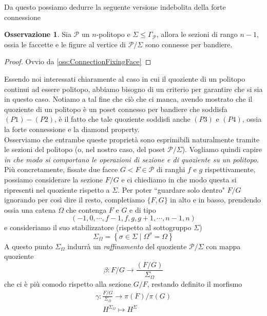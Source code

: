 \documentclass[a4paper,12pt]{report}
\newcommand{\p}{\mathcal{P}}
\theoremstyle{plain}
\theoremstyle{definition}
\newtheorem{oss}[teo]{Osservazione}
\begin{document}
Da questo possiamo dedurre la seguente versione indebolita della forte connessione
\begin{oss}
Sia $\p$ un $n$-politopo e $\Sigma\leq\Gamma_\p$, allora le sezioni di rango $n-1$, ossia le faccette e le figure al vertice di $\p/\Sigma$ sono
connesse per bandiere.
\end{oss}
\begin{proof}
Ovvio da \ref{oss:ConnectionFixingFace}
\end{proof}
Essendo noi interessati chiaramente al caso in cui il quoziente di un politopo continui ad essere politopo, abbiamo bisogno di un criterio per
garantire che si sia in questo caso. Notiamo a tal fine che ci\`o che ci manca, avendo mostrato che il quoziente di un politopo \`e un poset
connesso per bandiere che soddisfa $(P1)-(P2)$, \`e il fatto che tale quoziente soddisfi anche $(P3)$ e $(P4)$, ossia la forte connessione e la
diamond property.\\
Osserviamo che entrambe queste propriet\`a sono esprimibili naturalmente tramite le sezioni del politopo (o, nel nostro caso, del poset $\p/\Sigma$).
Vogliamo quindi capire \emph{in che modo si comportano le operazioni di sezione e di quoziente su un politopo}.\\
Pi\`u concretamente, fissate due facce $G<F\in\p$ di ranghi $f$ e $g$ rispettivamente, possiamo considerare la sezione $F/G$ e ci chiediamo in che
modo questa si ripresenti nel quoziente rispetto a $\Sigma$. Per poter ``guardare solo dentro" $F/G$ ignorando per cos\`i dire il resto,
completiamo $\{F,G\}$ in alto e in basso, prendendo ossia una catena $\Omega$ che contenga $F$ e $G$ e di tipo
\begin{equation*}
(-1,0,\cdots,f-1,f,g,g+1,\cdots,n-1,n)
\end{equation*}
e consideriamo il suo stabilizzatore (rispetto al sottogruppo $\Sigma$)
\begin{equation*}
\Sigma_\Omega=\left\{\sigma\in\Sigma\mid\Omega^\sigma=\Omega\right\}
\end{equation*}
A questo punto $\Sigma_\Omega$ indurr\`a un \emph{raffinamento} del quoziente $\p/\Sigma$ con mappa quoziente
\begin{equation}
\label{eq:betaMap}
\beta:F/G\longrightarrow\frac{(F/G)}{\Sigma_\Omega}
\end{equation}
che ci \`e pi\`u comodo rispetto alla sezione $G/F$, restando definito il morfismo
\begin{gather}
\label{eq:gammaMap}
\gamma:\frac{F/G}{\Sigma_\Omega}\longrightarrow \pi(F)/\pi(G)\\
\quad H^{\Sigma_\Omega}\longmapsto H^\Sigma
\end{gather}
\end{document}
